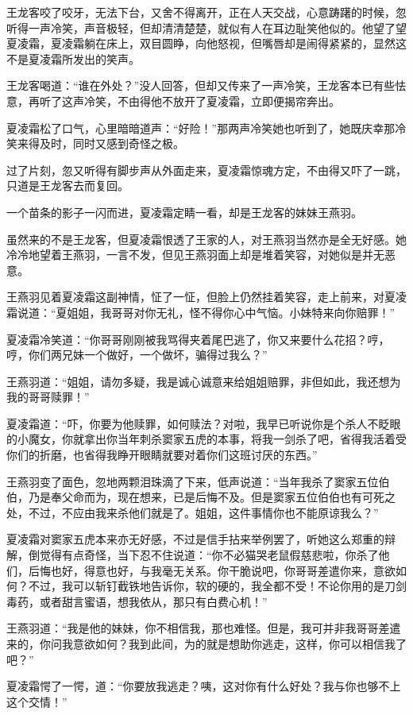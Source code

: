 \documentclass[12pt,oneside]{book}
\begin{document}
王龙客咬了咬牙，无法下台，又舍不得离开，正在人天交战，心意踌躇的时候，忽听得一声冷笑，声音极轻，但却清清楚楚，就似有人在耳边耻笑他似的。他望了望夏凌霜，夏凌霜躺在床上，双目圆睁，向他怒视，但嘴唇却是闹得紧紧的，显然这不是夏凌霜所发出的笑声。

王龙客喝道：``谁在外处？''没人回答，但却又传来了一声冷笑，王龙客本已有些怯意，再听了这声冷笑，不由得他不放开了夏凌霜，立即便揭帘奔出。

夏凌霜松了口气，心里暗暗道声：``好险！''那两声冷笑她也听到了，她既庆幸那冷笑来得及时，同时又感到奇怪之极。

过了片刻，忽又听得有脚步声从外面走来，夏凌霜惊魂方定，不由得又吓了一跳，只道是王龙客去而复回。

一个苗条的影子一闪而进，夏凌霜定睛一看，却是王龙客的妹妹王燕羽。

虽然来的不是王龙客，但夏凌霜恨透了王家的人，对王燕羽当然亦是全无好感。她冷冷地望着王燕羽，一言不发，但见王燕羽面上却是堆着笑容，对她似是并无恶意。

王燕羽见着夏凌霜这副神情，怔了一怔，但脸上仍然挂着笑容，走上前来，对夏凌霜说道：``夏姐姐，我哥哥对你无礼，怪不得你心中气恼。小妹特来向你赔罪！''

夏凌霜冷笑道：``你哥哥刚刚被我骂得夹着尾巴逃了，你又来要什么花招？哼，哼，你们两兄妹一个做好，一个做坏，骗得过我么？''

王燕羽道：``姐姐，请勿多疑，我是诚心诚意来给姐姐赔罪，非但如此，我还想为我的哥哥赎罪！''

夏凌霜道：``吓，你要为他赎罪，如何赎法？对啦，我早已听说你是个杀人不眨眼的小魔女，你就拿出你当年刺杀窦家五虎的本事，将我一剑杀了吧，省得我活着受你们的折磨，也省得我睁开眼睛就要对着你们这班讨厌的东西。''

王燕羽变了面色，忽地两颗泪珠滴了下来，低声说道：``当年我杀了窦家五位伯伯，乃是奉父命而为，现在想来，已是后悔不及。但是窦家五位伯伯也有可死之处，不过，不应由我来杀他们就是了。姐姐，这件事情你也不能原谅我么？''

夏凌霜对窦家五虎本来亦无好感，不过是信手拈来举例罢了，听她这么郑重的辩解，倒觉得有点奇怪，当下忍不住说道：``你不必猫哭老鼠假慈悲啦，你杀了他们，后悔也好，得意也好，与我毫无关系。你干脆说吧，你哥哥差遣你来，意欲如何？不过，我可以斩钉截铁地告诉你，软的硬的，我全都不受！不论你用的是刀剑毒药，或者甜言蜜语，想我依从，那只有白费心机！''

王燕羽道：``我是他的妹妹，你不相信我，那也难怪。但是，我可并非我哥哥差遣来的，你问我意欲如何？我到此间，为的就是想助你逃走，这样，你可以相信我了吧？''

夏凌霜愕了一愕，道：``你要放我逃走？咦，这对你有什么好处？我与你也够不上这个交情！''
\end{document}
